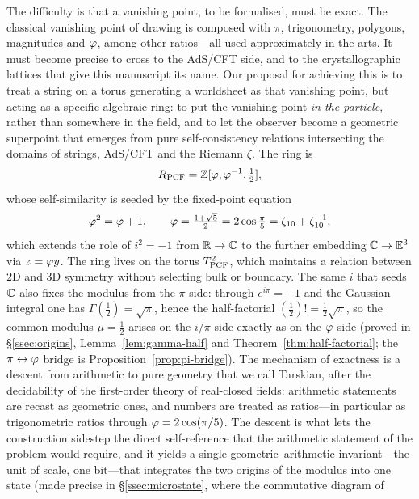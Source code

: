 The difficulty is that a vanishing point, to be formalised, must be exact. The classical
vanishing point of drawing is composed with $\pi$, trigonometry, polygons, magnitudes and
$\varphi$, among other ratios---all used approximately in the arts. It must become precise to
cross to the AdS/CFT side, and to the crystallographic lattices that give this manuscript its
name. Our proposal for achieving this is to treat a string on a torus generating a worldsheet
as that vanishing point, but acting as a specific algebraic ring: to put the vanishing point
\emph{in the particle}, rather than somewhere in the field, and to let the observer become a
geometric superpoint that emerges from pure self-consistency relations intersecting the
domains of strings, AdS/CFT and the Riemann $\zeta$. The ring is
\begin{equation}
R_{\mathrm{PCF}}=\mathbb{Z}[\varphi,\varphi^{-1},\tfrac12],
\end{equation}
whose self-similarity is seeded by the fixed-point equation
\begin{equation}\label{phi_sq_identity}
\varphi^{2}=\varphi+1,\qquad \varphi=\tfrac{1+\sqrt5}{2}=2\cos\tfrac{\pi}{5}=\zeta_{10}+\zeta_{10}^{-1},
\end{equation}
which extends the role of $i^{2}=-1$ from $\mathbb{R}\to\mathbb{C}$ to the further embedding $\mathbb{C}\to\mathbb{E}^{3}$ via
$z=\varphi y$. The ring lives on the torus $T^2_{\mathrm{PCF}}$, which maintains a relation between
$2$D and $3$D symmetry without selecting bulk or boundary. The same $i$ that seeds $\mathbb{C}$ also
fixes the modulus from the $\pi$-side: through $e^{i\pi}=-1$ and the Gaussian integral one has
$\Gamma(\tfrac12)=\sqrt\pi$, hence the half-factorial $(\tfrac12)!=\tfrac12\sqrt\pi$, so the
common modulus $\mu=\tfrac12$ arises on the $i$/$\pi$ side exactly as on the $\varphi$ side
(proved in \S\ref{ssec:origins}, Lemma~\ref{lem:gamma-half} and
Theorem~\ref{thm:half-factorial}; the $\pi\leftrightarrow\varphi$ bridge is
Proposition~\ref{prop:pi-bridge}). The mechanism of exactness is a descent from arithmetic to
pure geometry that we call Tarskian, after the decidability of the first-order theory of
real-closed fields: arithmetic statements are recast as geometric ones, and numbers are
treated as ratios---in particular as trigonometric ratios through $\varphi=2\cos(\pi/5)$. The
descent is what lets the construction sidestep the direct self-reference that the arithmetic
statement of the problem would require, and it yields a single geometric--arithmetic
invariant---the unit of scale, one bit---that integrates the two origins of the modulus into
one state (made precise in \S\ref{ssec:microstate}, where the commutative diagram of
